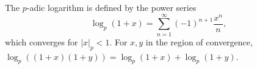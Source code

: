 The $p$-adic logarithm is defined by the power series $$\log_p(1+x) = \sum_{n=1}^\infty (-1)^{n+1} \frac{x^n}{n},$$ which converges for $|x|_p < 1$. For $x,y$ in the region of convergence, $\log_p((1+x)(1+y)) = \log_p(1+x) + \log_p(1+y)$.